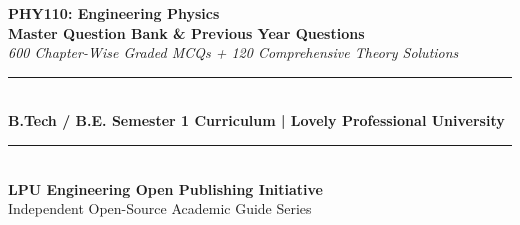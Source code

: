 \begin{titlepage}
\centering
\vspace*{1.5cm}
{\Huge \textbf{\color{LPUNavy}PHY110: Engineering Physics}}\\[0.5cm]
{\LARGE \textbf{\color{LPUOrange}Master Question Bank \& Previous Year Questions}}\\[0.3cm]
{\large \textit{600 Chapter-Wise Graded MCQs + 120 Comprehensive Theory Solutions}}\\[2cm]

\rule{\linewidth}{1.5pt}\\[0.5cm]
{\large \textbf{B.Tech / B.E. Semester 1 Curriculum | Lovely Professional University}}\\[0.5cm]
\rule{\linewidth}{1.5pt}\\[2.5cm]

\vfill
{\large \textbf{LPU Engineering Open Publishing Initiative}}\\[0.2cm]
{\small Independent Open-Source Academic Guide Series}
\end{titlepage}
\newpage
